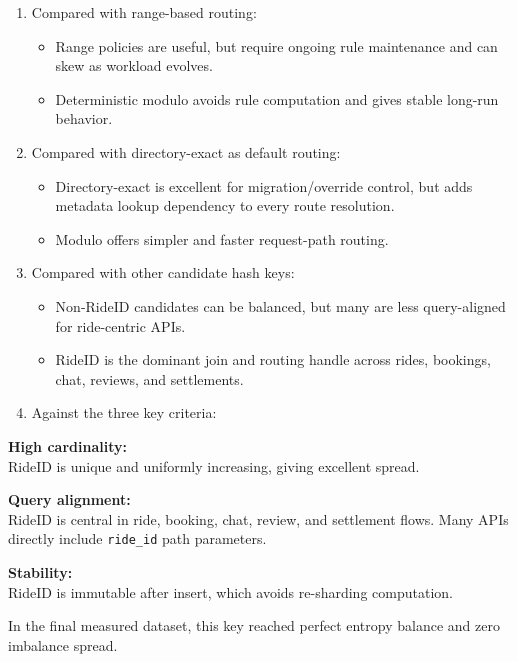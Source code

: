 \documentclass[12pt]{article}
\begin{document}
\begin{enumerate}
    \item Compared with range-based routing:
    \begin{itemize}
        \item Range policies are useful, but require ongoing rule maintenance and can skew as workload evolves.
        \item Deterministic modulo avoids rule computation and gives stable long-run behavior.
    \end{itemize}

    \item Compared with directory-exact as default routing:
    \begin{itemize}
        \item Directory-exact is excellent for migration/override control, but adds metadata lookup dependency to every route resolution.
        \item Modulo offers simpler and faster request-path routing.
    \end{itemize}

    \item Compared with other candidate hash keys:
    \begin{itemize}
        \item Non-RideID candidates can be balanced, but many are less query-aligned for ride-centric APIs.
        \item RideID is the dominant join and routing handle across rides, bookings, chat, reviews, and settlements.
    \end{itemize}

    \item Against the three key criteria:
\end{enumerate}

\textbf{High cardinality:}\\
RideID is unique and uniformly increasing, giving excellent spread.

\textbf{Query alignment:}\\
RideID is central in ride, booking, chat, review, and settlement flows. Many APIs directly include \texttt{ride\_id} path parameters.

\textbf{Stability:}\\
RideID is immutable after insert, which avoids re-sharding computation.

In the final measured dataset, this key reached perfect entropy balance and zero imbalance spread.
\end{document}
